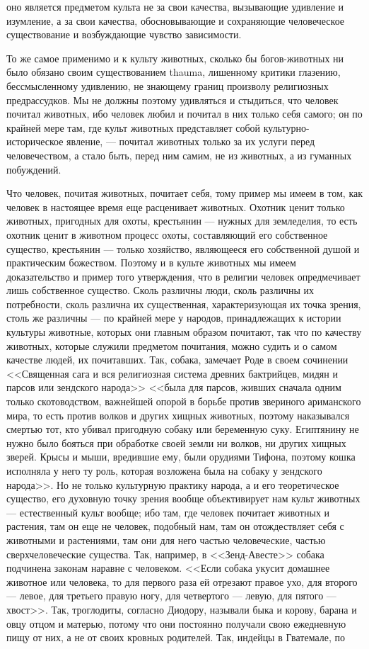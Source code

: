 \documentclass[12pt]{article}
\begin{document}
оно является предметом культа не за свои качества, вызывающие удивление и изумление, а за свои качества, обосновывающие и сохраняющие человеческое существование и возбуждающие чувство зависимости. 

То же самое применимо и к культу животных, сколько бы богов-животных ни было обязано своим существованием thauma, лишенному критики глазению, бессмысленному удивлению, не знающему границ произволу религиозных предрассудков. Мы не должны поэтому удивляться и стыдиться, что человек почитал животных, ибо человек любил и почитал в них только себя самого; он по крайней мере там, где культ животных представляет собой культурно-историческое явление, --- почитал животных только за их услуги перед человечеством, а стало быть, перед ним самим, не из животных, а из гуманных побуждений. 

Что человек, почитая животных, почитает себя, тому пример мы имеем в том, как человек в настоящее время еще расценивает животных. Охотник ценит только животных, пригодных для охоты, крестьянин --- нужных для земледелия, то есть охотник ценит в животном процесс охоты, составляющий его собственное существо, крестьянин --- только хозяйство, являющееся его собственной душой и практическим божеством. Поэтому и в культе животных мы имеем доказательство и пример того утверждения, что в религии человек опредмечивает лишь собственное существо. Сколь различны люди, сколь различны их потребности, сколь различна их существенная, характеризующая их точка зрения, столь же различны --- по крайней мере у народов, принадлежащих к истории культуры животные, которых они главным образом почитают, так что по качеству животных, которые служили предметом почитания, можно судить и о самом качестве людей, их почитавших. Так, собака, замечает Роде в своем сочинении <<Священная сага и вся религиозная система древних бактрийцев, мидян и парсов или зендского народа>>  <<была для парсов, живших сначала одним только скотоводством, важнейшей опорой в борьбе против звериного ариманского мира, то есть против волков и других хищных животных, поэтому наказывался смертью тот, кто убивал пригодную собаку или беременную суку. Египтянину не нужно было бояться при обработке своей земли ни волков, ни других хищных зверей. Крысы и мыши, вредившие ему, были орудиями Тифона, поэтому кошка исполняла у него ту роль, которая возложена была на собаку у зендского народа>>. Но не только культурную практику народа, а и его теоретическое существо, его духовную точку зрения вообще объективирует нам культ животных --- естественный культ вообще; ибо там, где человек почитает животных и растения, там он еще не человек, подобный нам, там он отождествляет себя с животными и растениями, там они для него частью человеческие, частью сверхчеловеческие существа. Так, например, в <<Зенд-Авесте>> собака подчинена законам наравне с человеком. <<Если собака укусит домашнее животное или человека, то для первого раза ей отрезают правое ухо, для второго --- левое, для третьего правую ногу, для четвертого --- левую, для пятого --- хвост>>. Так, троглодиты, согласно Диодору, называли быка и корову, барана и овцу отцом и матерью, потому что они постоянно получали свою ежедневную пищу от них, а не от своих кровных родителей. Так, индейцы в Гватемале, по 
\end{document}
